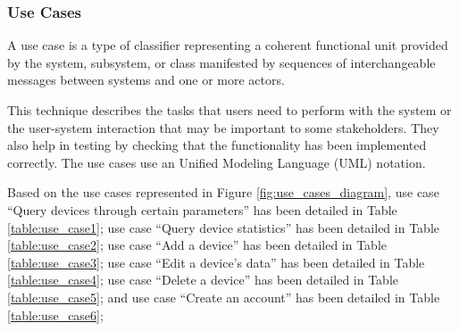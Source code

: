 \subsubsection{Use Cases}

A use case is a type of classifier representing a
coherent functional unit provided by the system, subsystem, or class manifested
by sequences of interchangeable messages between systems and one or more
actors.

This technique describes the tasks that users need to perform with
the system or the user-system interaction that may be important to some
stakeholders. They also help in testing by checking that the functionality
has been implemented correctly. The use cases use an Unified Modeling
Language (UML) notation.

Based on the use cases represented in Figure \ref{fig:use_cases_diagram},
use case ``Query devices through certain parameters'' has been detailed in Table \ref{table:use_case1};
use case ``Query device statistics'' has been detailed in Table \ref{table:use_case2};
use case ``Add a device'' has been detailed in Table \ref{table:use_case3};
use case ``Edit a device's data'' has been detailed in Table \ref{table:use_case4};
use case ``Delete a device'' has been detailed in Table \ref{table:use_case5};
and use case ``Create an account'' has been detailed in Table \ref{table:use_case6};

